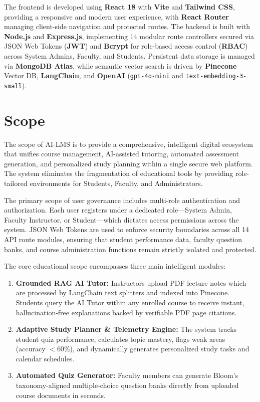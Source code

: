 The frontend is developed using \textbf{React 18} with \textbf{Vite} and \textbf{Tailwind CSS}, providing a responsive and modern user experience, with \textbf{React Router} managing client-side navigation and protected routes. The backend is built with \textbf{Node.js} and \textbf{Express.js}, implementing 14 modular route controllers secured via JSON Web Tokens (\textbf{JWT}) and \textbf{Bcrypt} for role-based access control (\textbf{RBAC}) across System Admins, Faculty, and Students. Persistent data storage is managed via \textbf{MongoDB Atlas}, while semantic vector search is driven by \textbf{Pinecone} Vector DB, \textbf{LangChain}, and \textbf{OpenAI} (\texttt{gpt-4o-mini} and \texttt{text-embedding-3-small}).

\section{Scope}

The scope of AI-LMS is to provide a comprehensive, intelligent digital ecosystem that unifies course management, AI-assisted tutoring, automated assessment generation, and personalized study planning within a single secure web platform. The system eliminates the fragmentation of educational tools by providing role-tailored environments for Students, Faculty, and Administrators.

The primary scope of user governance includes multi-role authentication and authorization. Each user registers under a dedicated role—System Admin, Faculty Instructor, or Student—which dictates access permissions across the system. JSON Web Tokens are used to enforce security boundaries across all 14 API route modules, ensuring that student performance data, faculty question banks, and course administration functions remain strictly isolated and protected.

The core educational scope encompasses three main intelligent modules:
\begin{enumerate}
    \item \textbf{Grounded RAG AI Tutor:} Instructors upload PDF lecture notes which are processed by LangChain text splitters and indexed into Pinecone. Students query the AI Tutor within any enrolled course to receive instant, hallucination-free explanations backed by verifiable PDF page citations.
    \item \textbf{Adaptive Study Planner \& Telemetry Engine:} The system tracks student quiz performance, calculates topic mastery, flags weak areas (accuracy $<60\%$), and dynamically generates personalized study tasks and calendar schedules.
    \item \textbf{Automated Quiz Generator:} Faculty members can generate Bloom's taxonomy-aligned multiple-choice question banks directly from uploaded course documents in seconds.
\end{enumerate}

